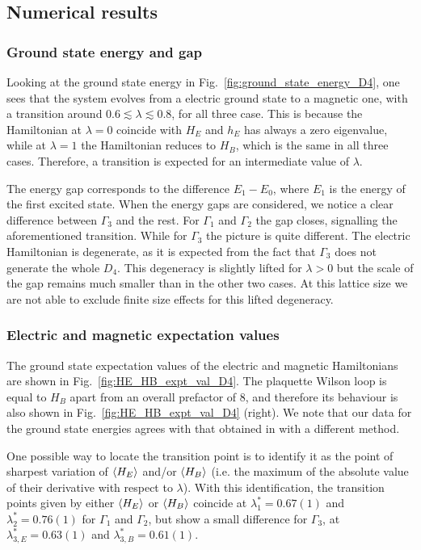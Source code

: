 \subsection{Numerical results}
\label{sub:numerical_results_D4}

\subsubsection*{Ground state energy and gap}

Looking at the ground state energy in Fig.~\ref{fig:ground_state_energy_D4}, one sees that the system evolves from a electric ground state to a magnetic one, with a transition around $0.6 \lesssim \lambda \lesssim 0.8$, for all three case.
This is because the Hamiltonian at $\lambda = 0$ coincide with $H_E$ and $h_E$ has always a zero eigenvalue, while at $\lambda=1$ the Hamiltonian reduces to $H_B$, which is the same in all three cases.
Therefore, a transition is expected for an intermediate value of $\lambda$.

The energy gap corresponds to the difference $E_1 - E_0$, where $E_1$ is the energy of the first excited state.
When the energy gaps are considered, we notice a clear difference between $\Gamma_3$ and the rest.
For $\Gamma_1$ and $\Gamma_2$ the gap closes, signalling the aforementioned transition.
While for $\Gamma_3$ the picture is quite different.
The electric Hamiltonian is degenerate, as it is expected from the fact that $\Gamma_3$ does not generate the whole $D_4$.
This degeneracy is slightly lifted for $\lambda > 0$ but the scale of the gap remains much smaller than in the other two cases.
At this lattice size we are not able to exclude finite size effects for this lifted degeneracy.

\subsubsection*{Electric and magnetic expectation values}

The ground state expectation values of the electric and magnetic Hamiltonians are shown in Fig.~\ref{fig:HE_HB_expt_val_D4}.
The plaquette Wilson loop is equal to $H_B$ apart from an overall prefactor of $8$, and therefore its behaviour is also shown in Fig.~\ref{fig:HE_HB_expt_val_D4} (right).
We note that our data for the ground state energies agrees with that obtained in \cite{marchesethesis} with a different method.

One possible way to locate the transition point is to identify it as the point of sharpest variation of $\expval{H_E}$ and/or $\expval{H_B}$ (i.e. the maximum of the absolute value of their derivative with respect to $\lambda$).
With this identification, the transition points given by either $\expval{H_E}$ or $\expval{H_B}$ coincide at $\lambda_1^* = 0.67(1)$ and $\lambda_2^* = 0.76(1)$ for $\Gamma_1$ and $\Gamma_2$, but show a small difference for $\Gamma_3$, at $\lambda_{3,E}^* = 0.63(1)$ and $\lambda_{3,B}^* = 0.61(1)$.


